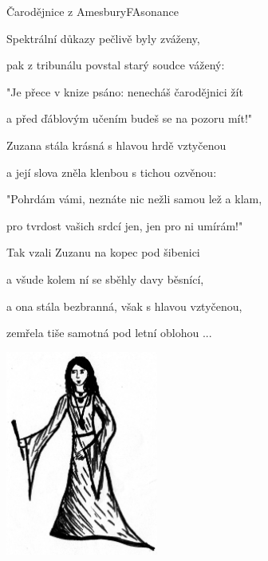 \begin{song}{Čarodějnice z Amesbury}{F}{Asonance}
\begin{SBVerse}
  \end{SBVerse}

  \begin{SBVerse}
Spektrální důkazy pečlivě byly zváženy,

pak z tribunálu povstal starý soudce vážený:

"Je přece v knize psáno: nenecháš čarodějnici žít

a před ďáblovým učením budeš se na pozoru mít!"

  \end{SBVerse}

  \begin{SBVerse}
Zuzana stála krásná s hlavou hrdě vztyčenou

a její slova zněla klenbou s tichou ozvěnou:

"Pohrdám vámi, neznáte nic nežli samou lež a klam,

pro tvrdost vašich srdcí jen, jen pro ni umírám!"

  \end{SBVerse}

  \begin{SBVerse}
Tak vzali Zuzanu na kopec pod šibenici

a všude kolem ní se sběhly davy běsnící,

a ona stála bezbranná, však s hlavou vztyčenou,

zemřela tiše samotná pod letní oblohou ...


  \end{SBVerse}
  \begin{center}
\includegraphics[width=5cm]{pict/carodejnice_z_amesbury}
\end{center}
\end{song}
\pagebreak
